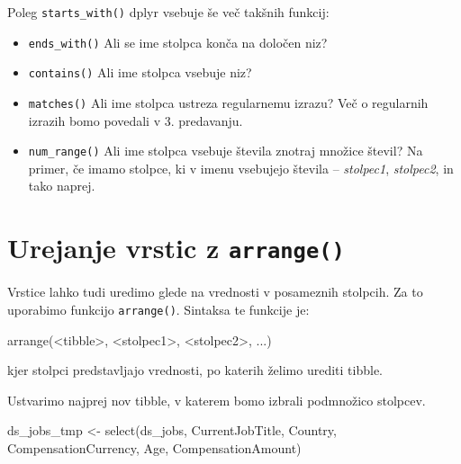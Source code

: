 \documentclass[
]{book}
\newenvironment{Shaded}{\begin{snugshade}}{\end{snugshade}}
\newcommand{\FunctionTok}[1]{\textcolor[rgb]{0.00,0.00,0.00}{#1}}
\newcommand{\NormalTok}[1]{#1}
\newcommand{\OtherTok}[1]{\textcolor[rgb]{0.56,0.35,0.01}{#1}}
\newcommand{\SpecialCharTok}[1]{\textcolor[rgb]{0.00,0.00,0.00}{#1}}
\providecommand{\tightlist}{%
  \setlength{\itemsep}{0pt}\setlength{\parskip}{0pt}}
\begin{document}
Poleg \texttt{starts\_with()} dplyr vsebuje še več takšnih funkcij:

\begin{itemize}
\tightlist
\item
  \texttt{ends\_with()} Ali se ime stolpca konča na določen niz?
\item
  \texttt{contains()} Ali ime stolpca vsebuje niz?
\item
  \texttt{matches()} Ali ime stolpca ustreza regularnemu izrazu? Več o regularnih izrazih bomo povedali v 3. predavanju.
\item
  \texttt{num\_range()} Ali ime stolpca vsebuje števila znotraj množice števil? Na primer, če imamo stolpce, ki v imenu vsebujejo števila -- \emph{stolpec1}, \emph{stolpec2}, in tako naprej.
\end{itemize}

\hypertarget{urejanje-vrstic-z-arrange}{%
\section{\texorpdfstring{Urejanje vrstic z \texttt{arrange()}}{Urejanje vrstic z arrange()}}\label{urejanje-vrstic-z-arrange}}

Vrstice lahko tudi uredimo glede na vrednosti v posameznih stolpcih. Za to uporabimo funkcijo \texttt{arrange()}. Sintaksa te funkcije je:

\begin{Shaded}
\begin{Highlighting}[]
\FunctionTok{arrange}\NormalTok{(}\SpecialCharTok{\textless{}}\NormalTok{tibble}\SpecialCharTok{\textgreater{}}\NormalTok{, }\SpecialCharTok{\textless{}}\NormalTok{stolpec1}\SpecialCharTok{\textgreater{}}\NormalTok{, }\SpecialCharTok{\textless{}}\NormalTok{stolpec2}\SpecialCharTok{\textgreater{}}\NormalTok{, ...)}
\end{Highlighting}
\end{Shaded}

kjer stolpci predstavljajo vrednosti, po katerih želimo urediti tibble.

Ustvarimo najprej nov tibble, v katerem bomo izbrali podmnožico stolpcev.

\begin{Shaded}
\begin{Highlighting}[]
\NormalTok{ds\_jobs\_tmp }\OtherTok{\textless{}{-}} \FunctionTok{select}\NormalTok{(ds\_jobs, CurrentJobTitle, Country, }
\NormalTok{                      CompensationCurrency, Age, CompensationAmount)}
\end{Highlighting}
\end{Shaded}
\end{document}
